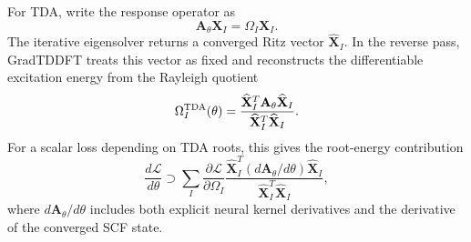 For TDA, write the response operator as
\begin{equation}
  \mathbf{A}_{\theta}\mathbf{X}_I
  =
  \Omega_I \mathbf{X}_I .
  \label{eq:tda-root-si}
\end{equation}
The iterative eigensolver returns a converged Ritz vector
$\widehat{\mathbf{X}}_I$. In the reverse pass, GradTDDFT treats this
vector as fixed and reconstructs the differentiable excitation energy
from the Rayleigh quotient
\begin{equation}
  \Omega_I^{\rm TDA}(\theta)
  =
  \frac{
    \widehat{\mathbf{X}}_I^{T}
    \mathbf{A}_{\theta}
    \widehat{\mathbf{X}}_I
  }{
    \widehat{\mathbf{X}}_I^{T}
    \widehat{\mathbf{X}}_I
  }.
  \label{eq:tda-rayleigh-si}
\end{equation}
For a scalar loss depending on TDA roots, this gives the
root-energy contribution
\begin{equation}
  \frac{d\mathcal{L}}{d\theta}
  \supset
  \sum_I
  \frac{\partial\mathcal{L}}{\partial\Omega_I}
  \frac{
    \widehat{\mathbf{X}}_I^{T}
    \left(d\mathbf{A}_{\theta}/d\theta\right)
    \widehat{\mathbf{X}}_I
  }{
    \widehat{\mathbf{X}}_I^{T}
    \widehat{\mathbf{X}}_I
  },
  \label{eq:tda-root-gradient-si}
\end{equation}
where $d\mathbf{A}_{\theta}/d\theta$ includes both explicit neural
kernel derivatives and the derivative of the converged SCF state.

